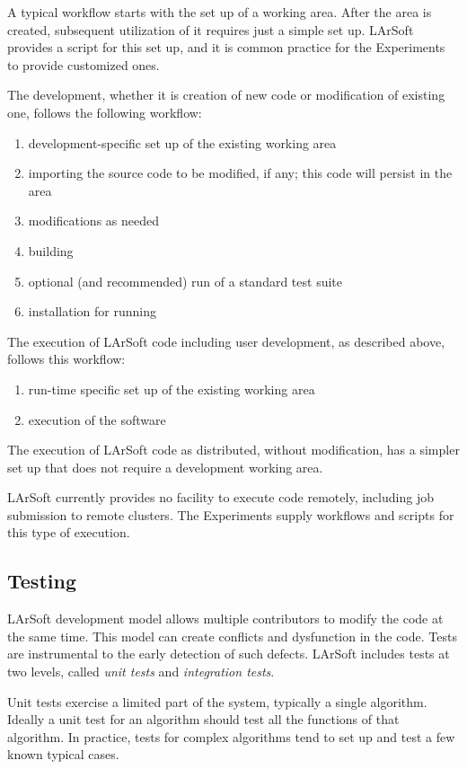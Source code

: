 A typical workflow starts with the set up of a working area.
After the area is created, subsequent utilization of it requires just a simple set up.
LArSoft provides a script for this set up,
and it is common practice for the Experiments to provide customized ones.

The development, whether it is creation of new code or modification of existing one,
follows the following workflow:
\begin{enumerate}
   \item development-specific set up of the existing working area
   \item importing the source code to be modified, if any; this code will persist in the area
   \item modifications as needed
   \item building
   \item optional (and recommended) run of a standard test suite
   \item installation for running
\end{enumerate}

The execution of LArSoft code including user development, as described above,
follows this workflow:
\begin{enumerate}
   \item run-time specific set up of the existing working area
   \item execution of the software
\end{enumerate}
The execution of LArSoft code as distributed, without modification,
has a simpler set up that does not require a development working area.

LArSoft currently provides no facility to execute code remotely,
including job submission to remote clusters.
The Experiments supply workflows and scripts for this type of execution.



\subsection{Testing}
\label{ssec:Development:testing}

LArSoft development model allows multiple contributors to modify the
code at the same time. This model can create conflicts and dysfunction
in the code. Tests are instrumental to the early detection of such
defects. LArSoft includes tests at two levels, called \emph{unit tests}
and \emph{integration tests}.

Unit tests exercise a limited part of the system, typically a single
algorithm. Ideally a unit test for an algorithm should test all the
functions of that algorithm. In practice, tests for complex algorithms
tend to set up and test a few known typical cases.

